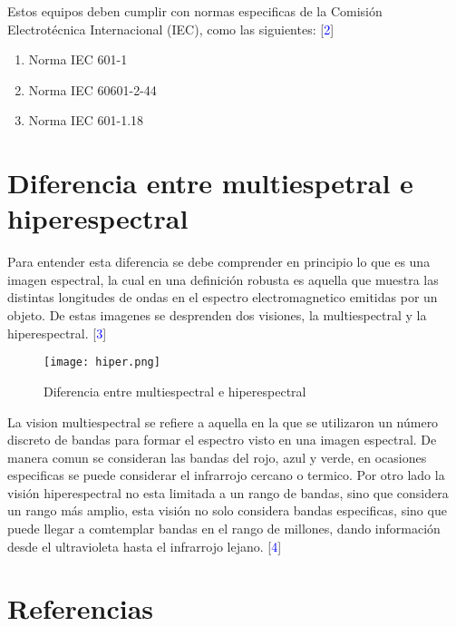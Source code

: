 \documentclass{article}
\begin{document}
\vspace{10pt}


Estos equipos deben cumplir con normas especificas de la Comisión Electrotécnica Internacional (IEC), como las siguientes: [\textcolor{blue}{2}]


\begin{enumerate}
    \item Norma IEC 601-1
    \item Norma IEC 60601-2-44
    \item Norma IEC 601-1.18
\end{enumerate}

\section{Diferencia entre multiespetral e hiperespectral}


Para entender esta diferencia se debe comprender en principio lo que es una imagen espectral, la cual en una definición robusta es aquella que muestra las distintas longitudes de ondas en el espectro electromagnetico emitidas por un objeto. De estas imagenes se desprenden dos visiones, la multiespectral y la hiperespectral. [\textcolor{blue}{3}]


\begin{figure}[h!]
    \centering
    \texttt{[image: hiper.png]}
    \caption{Diferencia entre multiespectral e hiperespectral}
    \label{t1}
\end{figure}


La vision multiespectral se refiere a aquella en la que se utilizaron un número discreto de bandas para formar el espectro visto en una imagen espectral. De manera comun se consideran las bandas del rojo, azul y verde, en ocasiones especificas se puede considerar el infrarrojo cercano o termico. Por otro lado la visión hiperespectral no esta limitada a un rango de bandas, sino que considera un rango más amplio, esta visión no solo considera bandas especificas, sino que puede llegar a comtemplar bandas en el rango de millones, dando información desde el ultravioleta hasta el infrarrojo lejano. [\textcolor{blue}{4}] 


\section*{Referencias}
\end{document}

